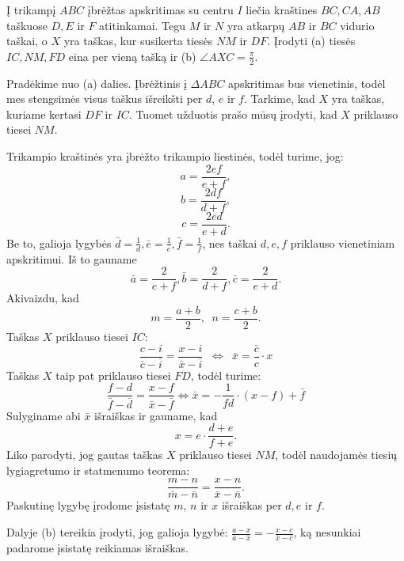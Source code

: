 \documentclass[11pt,a4paper,twoside]{book}
\begin{document}
\begin{pavnr}
Į trikampį $ABC$ įbrėžtas apskritimas su centru $I$ liečia kraštines $BC, CA, AB$ taškuose $D, E$ ir $F$ atitinkamai. Tegu $M$ ir $N$ yra atkarpų $AB$ ir $BC$ vidurio taškai, o $X$ yra taškas, kur susikerta tiesės $NM$ ir $DF$. Įrodyti (a) tiesės $IC, NM, FD$ eina per vieną tašką ir (b) $\angle AXC = \frac{\pi}{2}$. 
\end{pavnr}

\begin{sprendimas}
Pradėkime nuo (a) dalies. Įbrėžtinis į $\Delta ABC$ apskritimas bus vienetinis, todėl mes stengsimės visus taškus išreikšti per $d$, $e$ ir $f$. Tarkime, kad $X$ yra taškas, kuriame kertasi $DF$ ir $IC$. Tuomet užduotis prašo mūsų įrodyti, kad $X$ priklauso tiesei $NM$. 

Trikampio kraštinės yra įbrėžto trikampio liestinės, todėl turime, jog:
$$ a =\frac{2ef}{e+f},$$
$$ b=\frac{2df}{d+f},$$
$$ c=\frac{2ed}{e+d}.$$
Be to, galioja lygybės $\bar{d}= \frac{1}{d}, \bar{e}= \frac{1}{e}, \bar{f}= \frac{1}{f}$, nes taškai $d, e, f$ priklauso vienetiniam apskritimui. Iš to gauname
$$ \bar a =\frac{2}{e+f}, \bar b=\frac{2}{d+f}, \bar c=\frac{2}{e+d}.$$
Akivaizdu, kad
$$ m=\frac{a+b}{2}, \phantom{a} n=\frac{c+b}{2}.$$
Taškas $X$ priklauso tiesei $IC$:
$$ \frac{c-i}{\bar{c}-\overline{i}}=\frac{x-i}{\bar{x} - \overline{i}} {\phantom{a}}\Leftrightarrow \phantom{a} \bar{x}= \frac{\bar{c}}{c}\cdot  x $$ 
Taškas $X$ taip pat priklauso tiesei $FD$, todėl turime:
$$\frac{f-d}{\bar{f}-\bar{d}}=\frac{x-f}{\bar{x} - \bar{f}} \Leftrightarrow \bar{x}= -\frac{1}{fd}\cdot  (x-f)+\bar{f} $$
Sulyginame abi $\bar{x}$ išraiškas ir gauname, kad 
$$ x = e \cdot \frac{d+e}{f+e}.$$
Liko parodyti, jog gautas taškas $X$ priklauso tiesei $NM$, todėl naudojamės tiesių lygiagretumo ir statmenumo teorema:
$$ \frac{m-n}{\bar{m}-\bar{n}}=\frac{x-n}{\bar{x} - \bar{n}}.$$
Paskutinę lygybę įrodome įsistatę $m$, $n$ ir $x$ išraiškas per $d, e$ ir $f$.

Dalyje (b) tereikia įrodyti, jog galioja lygybė: $\frac{a-x}{\bar{a}-\bar{x}}= - \frac{x-c}{\bar{x} - \bar{c}}$, ką nesunkiai padarome įsistatę reikiamas išraiškas.
\end{sprendimas}
\end{document}
